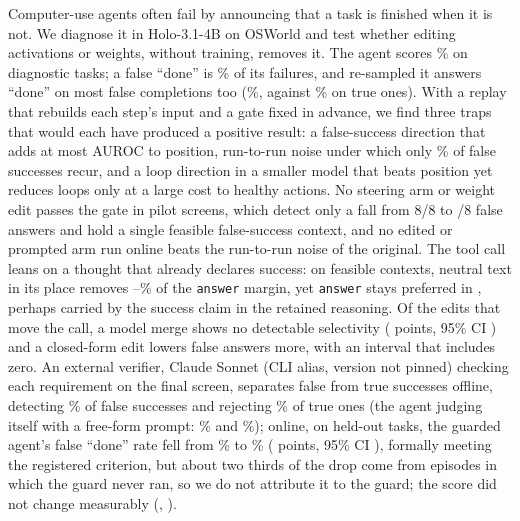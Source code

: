 Computer-use agents often fail by announcing that a task is finished when it is not. We diagnose it in Holo-3.1-4B on OSWorld and test whether editing activations or weights, without training, removes it. The agent scores \oswMeanScorePct\% on \oswNScored{} diagnostic tasks; a false ``done'' is \oswFsPct\% of its failures, and re-sampled it answers ``done'' on most false completions too (\pwOrigFspPct\%, against \pwOrigFsmPct\% on true ones). With a replay that rebuilds each step's input and a gate fixed in advance, we find three traps that would each have produced a positive result: a false-success direction that adds at most \ofPosGain{} AUROC to position, run-to-run noise under which only \rtmFsAgainPct\% of false successes recur, and a loop direction in a smaller model that beats position yet reduces loops only at a large cost to healthy actions. No steering arm or weight edit passes the gate in pilot screens, which detect only a fall from 8/8 to \gateMaxAnswers/8 false answers and hold a single feasible false-success context, and no edited or prompted arm run online beats the run-to-run noise of the original. The tool call leans on a thought that already declares success: on \paN{} feasible contexts, neutral text in its place removes \paFracTrue--\paFracFs\% of the \texttt{answer} margin, yet \texttt{answer} stays preferred in \paNeutralPosAll, perhaps carried by the success claim in the retained reasoning. Of the edits that move the call, a model merge shows no detectable selectivity (\pwCuaSel{} points, 95\% CI \pwCuaSelCi) and a closed-form edit lowers false answers more, with an interval that includes zero. An external verifier, Claude Sonnet (CLI alias, version not pinned) checking each requirement on the final screen, separates false from true successes offline, detecting \gbClaudeDet\% of false successes and rejecting \gbClaudeRej\% of true ones (the agent judging itself with a free-form prompt: \gbHoloDet\% and \gbHoloRej\%); online, on \OgN{} held-out tasks, the guarded agent's false ``done'' rate fell from \OgFdBase\% to \OgFdGuard\% (\OgFdDiff{} points, 95\% CI \OgFdDiffCi), formally meeting the registered criterion, but about two thirds of the drop come from episodes in which the guard never ran, so we do not attribute it to the guard; the score did not change measurably (\OgScoreDiff, \OgScoreDiffCi).

